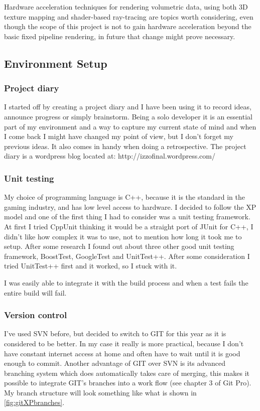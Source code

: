 \documentclass[11pt,fleqn,twoside]{article}
\begin{document}
Hardware acceleration techniques\cite{GPUAccelTech} for rendering volumetric data, using both 3D texture mapping\cite{GPUGemsCh39} and shader-based ray-tracing are topics worth considering, even though the scope of this project is not to gain hardware acceleration beyond the basic fixed pipeline rendering, in future that change might prove necessary.

\subsection{Environment Setup}


\subsubsection{Project diary}
\label{sec:projectDiary}

I started off by creating a project diary and I have been using it to record ideas, announce progress or simply brainstorm. Being a solo developer it is an essential part of my environment and a way to capture my current state of mind and when I come back I might have changed my point of view, but I don't forget my previous ideas. It also comes in handy when doing a retrospective. The project diary is a wordpress blog located at:
http://izzofinal.wordpress.com/


\subsubsection{Unit testing}
My choice of  programming language is C++, because it is the standard in the gaming industry, and has low level access to hardware. I decided to follow the XP model and one of the first thing I had to consider was a unit testing framework. At first I tried CppUnit thinking it would be a straight port of JUnit for C++, I didn't like how complex it was to use, not to mention how long it took me to setup. After some research I found out about three other good unit testing framework, BoostTest, GoogleTest and UnitTest++. After some consideration I tried UnitTest++ first and it worked, so I stuck with it.

I was easily able to integrate it with the build process and when a test fails the entire build will fail.

\subsubsection{Version control}
I've used SVN before, but decided to switch to GIT for this year as it is considered to be better. In my case it really is more practical, because I don't have constant internet access at home and often have to wait until it is good enough to commit. Another advantage of GIT over SVN is its advanced branching system which does automatically takes care of merging, this makes it possible to integrate GIT's branches into a work flow (see chapter 3 of Git Pro\cite{ProGit}). My branch structure will look something like what is shown in \ref{fig:gitXPbranches}.
\end{document}
